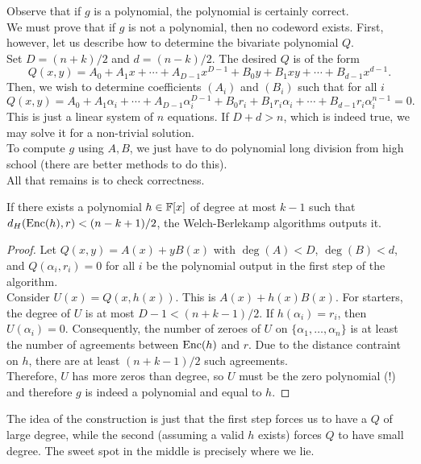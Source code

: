 		Observe that if $g$ is a polynomial, the polynomial is certainly correct.\\
		We must prove that if $g$ is not a polynomial, then no codeword exists. First, however, let us describe how to determine the bivariate polynomial $Q$.\\
		Set $D = (n+k)/2$ and $d = (n-k)/2$. The desired $Q$ is of the form
		\[ Q(x,y) = A_0 + A_1 x + \cdots + A_{D-1} x^{D-1} + B_0y + B_1xy + \cdots + B_{d-1} x^{d-1}. \]
		Then, we wish to determine coefficients $(A_i)$ and $(B_i)$ such that for all $i$
		\[ Q(x,y) = A_0 + A_1 \alpha_i + \cdots + A_{D-1} \alpha_i^{D-1} + B_0 r_i + B_1 r_i\alpha_i + \cdots + B_{d-1} r_i\alpha_i^{n-1} = 0. \]
		This is just a linear system of $n$ equations. If $D+d > n$, which is indeed true, we may solve it for a non-trivial solution.\\
		To compute $g$ using $A,B$, we just have to do polynomial long division from high school (there are better methods to do this).\\
		All that remains is to check correctness.

		\begin{ftheo}
			If there exists a polynomial $h \in \mathbb{F}[x]$ of degree at most $k-1$ such that $d_H(\operatorname{Enc}(h),r) < (n-k+1)/2$, the Welch-Berlekamp algorithms outputs it.
		\end{ftheo}
		\begin{proof}
			Let $Q(x,y) = A(x) + yB(x)$ with $\deg(A) < D$, $\deg(B) < d$, and $Q(\alpha_i,r_i) = 0$ for all $i$ be the polynomial output in the first step of the algorithm.\\

			Consider $U(x) = Q(x,h(x))$. This is $A(x) + h(x) B(x)$. For starters, the degree of $U$ is at most $D-1 < (n+k-1)/2$. If $h(\alpha_i) = r_i$, then $U(\alpha_i) = 0$. Consequently, the number of zeroes of $U$ on $\{\alpha_1,\ldots,\alpha_n\}$ is at least the number of agreements between $\operatorname{Enc}(h)$ and $r$. Due to the distance contraint on $h$, there are at least $(n+k-1)/2$ such agreements.\\
			Therefore, $U$ has more zeros than degree, so $U$ must be the zero polynomial (!) and therefore $g$ is indeed a polynomial and equal to $h$.
		\end{proof}
		The idea of the construction is just that the first step forces us to have a $Q$ of large degree, while the second (assuming a valid $h$ exists) forces $Q$ to have small degree. The sweet spot in the middle is precisely where we lie.\\

